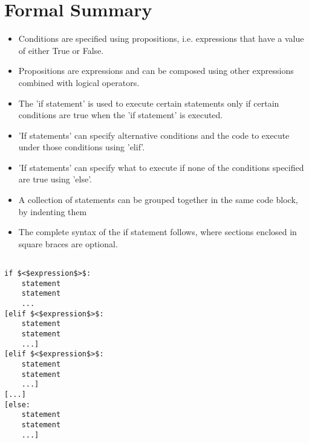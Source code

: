 \section{Formal Summary}
\begin{itemize}
	\item Conditions are specified using propositions, i.e. expressions that have a value of either True or False.
	\item Propositions are expressions and can be composed using other expressions combined with logical operators.
	\item The 'if statement' is used to execute certain statements only if certain conditions are true when the 'if statement' is executed.
	\item 'If statements' can specify alternative conditions and the code to execute under those conditions using 'elif'.
	\item 'If statements' can specify what to execute if none of the conditions specified are true using 'else'.
	\item A collection of statements can be grouped together in the same code block, by indenting them
	\item The complete syntax of the if statement follows, where sections enclosed in square braces are optional.
\end{itemize}
\begin{lstlisting}

if $<$expression$>$:
    statement
    statement
    ...
[elif $<$expression$>$:
    statement
    statement
    ...]
[elif $<$expression$>$:
    statement
    statement
    ...]
[...]
[else:
    statement
    statement
    ...]
\end{lstlisting}

